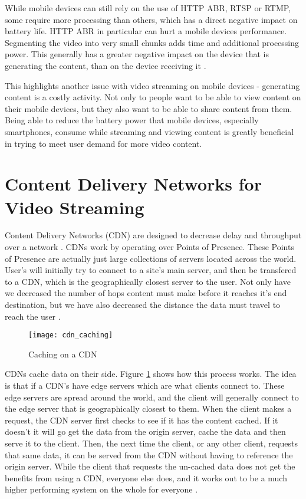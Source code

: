 \documentclass[12pt]{article}
\begin{document}
While mobile devices can still rely on the use of HTTP ABR, RTSP or RTMP, some require more processing than others, which has a direct negative impact on battery life.  HTTP ABR in particular can hurt a mobile devices performance.  Segmenting the video into very small chunks adds time and additional processing power.  This generally has a greater negative impact on the device that is generating the content, than on the device receiving it \cite{11720476820160701}.

This highlights another issue with video streaming on mobile devices - generating content is a costly activity.  Not only to people want to be able to view content on their mobile devices, but they also want to be able to share content from them.  Being able to reduce the battery power that mobile devices, especially smartphones, consume while streaming and viewing content is greatly beneficial in trying to meet user demand for more video content.

\section{Content Delivery Networks for Video Streaming}
Content Delivery Networks (CDN) are designed to decrease delay and throughput over a network \cite{6089062}.  CDNs work by operating over Points of Presence.  These Points of Presence are actually just large collections of servers located across the world.  User's will initially try to connect to a site's main server, and then be transfered to a CDN, which is the geographically closest server to the user.  Not only have we decreased the number of hops content must make before it reaches it's end destination, but we have also decreased the distance the data must travel to reach the user \cite{cdn_tutorial}.

\begin{figure}[h]
  \begin{center}
    \texttt{[image: cdn\_caching]}
    \caption{Caching on a CDN}
    \label{fig:cdn_caching}
  \end{center}
\end{figure}

CDNs cache data on their side.  Figure \ref{fig:cdn_caching} shows how this process works.  The idea is that if a CDN's have edge servers which are what clients connect to.  These edge servers are spread around the world, and the client will generally connect to the edge server that is geographically closest to them.  When the client makes a request, the CDN server first checks to see if it has the content cached.  If it doesn't it will go get the data from the origin server, cache the data and then serve it to the client.  Then, the next time the client, or any other client, requests that same data, it can be served from the CDN without having to reference the origin server.  While the client that requests the un-cached data does not get the benefits from using a CDN, everyone else does, and it works out to be a much higher performing system on the whole for everyone \cite{cdn_tutorial2}.
\end{document}
